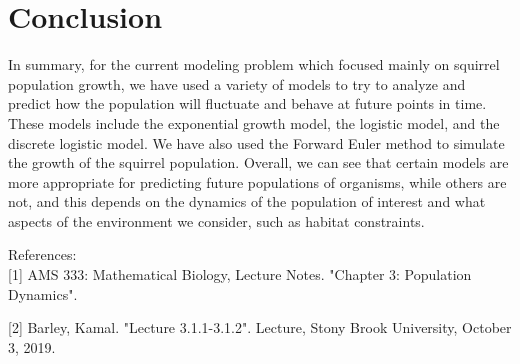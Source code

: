 \documentclass[12pt]{article}
\begin{document}
\section{Conclusion}
In summary, for the current modeling problem which focused mainly on squirrel population growth, we have used a variety of models to try to analyze and predict how the population will fluctuate and behave at future points in time. These models include the exponential growth model, the logistic model, and the discrete logistic model. We have also used the Forward Euler method to simulate the growth of the squirrel population. Overall, we can see that certain models are more appropriate for predicting future populations of organisms, while others are not, and this depends on the dynamics of the population of interest and what aspects of the environment we consider, such as habitat constraints.

 \vspace{1cm}

%
%

\begin{flushleft}
References:\\


[1] AMS 333: Mathematical Biology, Lecture Notes. "Chapter 3: Population Dynamics".

[2] Barley, Kamal. "Lecture 3.1.1-3.1.2". Lecture, Stony Brook University, October 3, 2019.

\end{flushleft}
\end{document}
